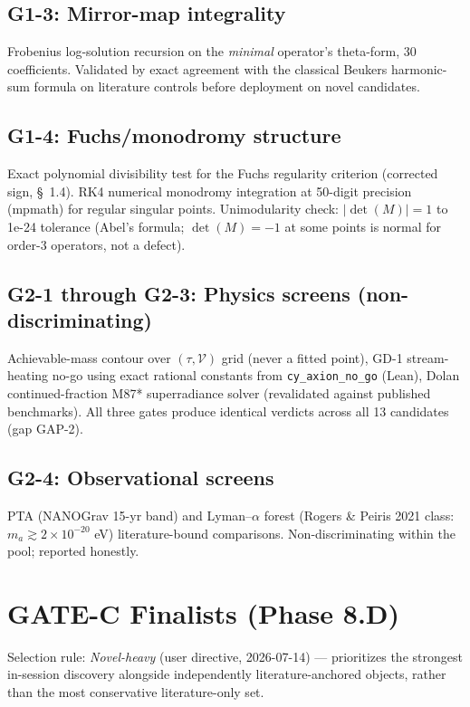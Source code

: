 \documentclass[aps,prd,twocolumn,nofootinbib,superscriptaddress,10pt]{revtex4-2}
\begin{document}
\subsection{G1-3: Mirror-map integrality}

Frobenius log-solution recursion on the \emph{minimal} operator's theta-form, 30 coefficients. Validated by exact agreement with the classical Beukers harmonic-sum formula on literature controls before deployment on novel candidates.

\subsection{G1-4: Fuchs/monodromy structure}

Exact polynomial divisibility test for the Fuchs regularity criterion (corrected sign, \S~1.4). RK4 numerical monodromy integration at 50-digit precision (mpmath) for regular singular points. Unimodularity check: $|\det(M)| = 1$ to 1e-24 tolerance (Abel's formula; $\det(M) = -1$ at some points is normal for order-3 operators, not a defect).

\subsection{G2-1 through G2-3: Physics screens (non-discriminating)}

Achievable-mass contour over $(\tau, \mathcal{V})$ grid (never a fitted point), GD-1 stream-heating no-go using exact rational constants from \texttt{cy\_axion\_no\_go} (Lean), Dolan continued-fraction M87* superradiance solver (revalidated against published benchmarks). All three gates produce identical verdicts across all 13 candidates (gap GAP-2).

\subsection{G2-4: Observational screens}

PTA (NANOGrav 15-yr band) and Lyman--$\alpha$ forest (Rogers \& Peiris 2021 class: $m_a \gtrsim 2 \times 10^{-20}$ eV) literature-bound comparisons. Non-discriminating within the pool; reported honestly.

\section{GATE-C Finalists (Phase 8.D)}

Selection rule: \emph{Novel-heavy} (user directive, 2026-07-14) --- prioritizes the strongest in-session discovery alongside independently literature-anchored objects, rather than the most conservative literature-only set.
\end{document}
